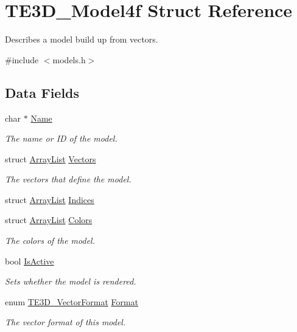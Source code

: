 \hypertarget{struct_t_e3_d___model4f}{\section{T\-E3\-D\-\_\-\-Model4f Struct Reference}
\label{struct_t_e3_d___model4f}
}


Describes a model build up from vectors.  




{\ttfamily \#include $<$models.\-h$>$}

\subsection*{Data Fields}
\begin{DoxyCompactItemize}
\item 
char $\ast$ \hyperlink{struct_t_e3_d___model4f_a5e6182c030324511dd82e9fa1a0ab071}{Name}
\begin{DoxyCompactList}\small\item\em The name or I\-D of the model. \end{DoxyCompactList}\item 
struct \hyperlink{struct_array_list}{Array\-List} \hyperlink{struct_t_e3_d___model4f_aa9dfdc40d8e1a7c6027adadf256728e5}{Vectors}
\begin{DoxyCompactList}\small\item\em The vectors that define the model. \end{DoxyCompactList}\item 
struct \hyperlink{struct_array_list}{Array\-List} \hyperlink{struct_t_e3_d___model4f_ac88633aa6222f5cafbb81f7c5edf6706}{Indices}
\item 
struct \hyperlink{struct_array_list}{Array\-List} \hyperlink{struct_t_e3_d___model4f_a25b98f42596bd573b7f64107a6c575f6}{Colors}
\begin{DoxyCompactList}\small\item\em The colors of the model. \end{DoxyCompactList}\item 
bool \hyperlink{struct_t_e3_d___model4f_a92c6b1cf703f9e064f5efc0907f80379}{Is\-Active}
\begin{DoxyCompactList}\small\item\em Sets whether the model is rendered. \end{DoxyCompactList}\item 
enum \hyperlink{models_8h_a68e3f605ef2dc9e35776b9c37f15495a}{T\-E3\-D\-\_\-\-Vector\-Format} \hyperlink{struct_t_e3_d___model4f_adf87402a13af165fe3e16c98458b4d2c}{Format}
\begin{DoxyCompactList}\small\item\em The vector format of this model. \end{DoxyCompactList}\end{DoxyCompactItemize}


